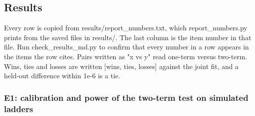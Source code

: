 \subsection*{Results}

Every row is copied from results/report\_numbers.txt, which report\_numbers.py prints from the saved files in results/. The last column is the item number in that file. Run check\_results\_md.py to confirm that every number in a row appears in the items the row cites. Pairs written as "x vs y" read one-term versus two-term. Wins, ties and losses are written [wins, ties, losses] against the joint fit, and a held-out difference within 1e-6 is a tie.

\subsubsection*{E1: calibration and power of the two-term test on simulated ladders}


